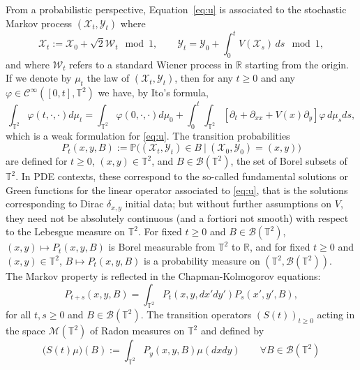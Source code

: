 \documentclass[12pt]{article}
\newcommand{\R}{\mathbb{R}}
\newcommand{\T}{\mathbb{T}}
\begin{document}
\medskip

From a probabilistic perspective, Equation~\eqref{eq:u} is associated to the
stochastic Markov process $(\mathcal{X}_t, \mathcal{Y}_t)$ where
\begin{equation}\label{eq:sp}
\mathcal{X}_t := \mathcal{X}_0 + \sqrt{2} \mathcal{W}_t \mod 1, \qquad 
\mathcal{Y}_t = \mathcal{Y}_0 + \int_0^t V(\mathcal{X}_s) \, ds \mod 1,
\end{equation}
and where $\mathcal{W}_t$ refers to a standard Wiener process in $\R$ starting from 
the origin. If we denote by $\mu_t$ the law of $(\mathcal{X}_t, \mathcal{Y}_t)$, then for any 
$t \geq 0$ and any $\varphi \in \mathcal{C}^\infty([0,t], \T^2)$ we have, by Ito's formula, 
\begin{equation*}\label{eq:weaklaw}
\int_{\T^2} \varphi(t,\cdot,\cdot) d\mu_t = \int_{\T^2} \varphi(0, \cdot,\cdot) d\mu_0 +
\int_0^t\int_{\T^2} \left[ \partial_t + \partial_{xx} +
V(x)\partial_y\right]\varphi \, d\mu_s ds,   
\end{equation*}
which is a weak formulation for \eqref{eq:u}. The transition probabilities
\begin{equation}\label{eq:tp}
P_t(x,y,B) := \mathbb{P}\big( (\mathcal{X}_t,\mathcal{Y}_t) \in B\: | \: 
(\mathcal{X}_0, \mathcal{Y}_0) = (x,y) \big)
\end{equation}
are defined for $t \geq 0$, $(x,y) \in \T^2$, and $B \in \mathcal{B}(\T^2)$, 
the set of Borel subsets of $\T^2$. In PDE
contexts, these correspond to the so-called fundamental 
solutions or Green functions for the linear operator associated to \eqref{eq:u}, 
that is the solutions corresponding to Dirac $\delta_{x,y}$ initial data; but 
without further assumptions on $V$, they need
not be absolutely continuous (and a fortiori not smooth) with respect 
to the Lebesgue measure on $\T^2$. 
For fixed $t\geq 0$ and $B \in \mathcal{B}(\T^2)$, $(x,y) \mapsto P_t(x,y,B)$ is 
Borel measurable from $\T^2$ to $\R$, and for fixed $t\geq 0$ and $(x,y) \in \T^2$, 
$B \mapsto P_t(x,y,B)$ is a probability measure on $(\T^2,\mathcal{B}(\T^2))$.\\
The Markov property is reflected in the Chapman-Kolmogorov equations:
\begin{equation}\label{eq:CK}
P_{t+s}(x, y, B) = \int_{\T^2} P_t(x, y, dx'dy')P_s(x', y', B),
\end{equation}
for all $t,s\geq 0$ and $B \in \mathcal{B}(\T^2).$ The
transition operators $(S(t))_{t\geq 0}$ acting in the space $\mathcal{M}(\T^2)$ 
of Radon measures on $\T^2$ and defined by 
$$
\big(S(t) \mu\big)(B) := \int_{\T^2} P_y(x,y,B) \mu(dxdy) \qquad\forall B \in \mathcal{B}(\T^2)
$$
\end{document}
